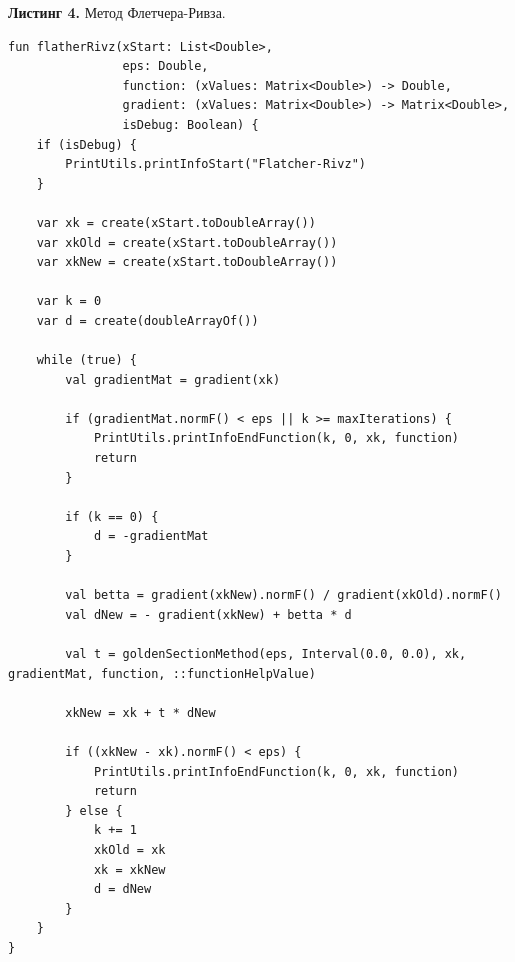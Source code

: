 \documentclass[a4paper, 12pt]{article}   	%
\begin{document}
\textbf{Листинг 4.} Метод Флетчера-Ривза.
    \begin{verbatim}
fun flatherRivz(xStart: List<Double>,
                eps: Double,
                function: (xValues: Matrix<Double>) -> Double,
                gradient: (xValues: Matrix<Double>) -> Matrix<Double>,
                isDebug: Boolean) {
    if (isDebug) {
        PrintUtils.printInfoStart("Flatcher-Rivz")
    }

    var xk = create(xStart.toDoubleArray())
    var xkOld = create(xStart.toDoubleArray())
    var xkNew = create(xStart.toDoubleArray())

    var k = 0
    var d = create(doubleArrayOf())

    while (true) {
        val gradientMat = gradient(xk)

        if (gradientMat.normF() < eps || k >= maxIterations) {
            PrintUtils.printInfoEndFunction(k, 0, xk, function)
            return
        }

        if (k == 0) {
            d = -gradientMat
        }

        val betta = gradient(xkNew).normF() / gradient(xkOld).normF()
        val dNew = - gradient(xkNew) + betta * d

        val t = goldenSectionMethod(eps, Interval(0.0, 0.0), xk, gradientMat, function, ::functionHelpValue)

        xkNew = xk + t * dNew

        if ((xkNew - xk).normF() < eps) {
            PrintUtils.printInfoEndFunction(k, 0, xk, function)
            return
        } else {
            k += 1
            xkOld = xk
            xk = xkNew
            d = dNew
        }
    }
}
\end{verbatim}
\end{document}
